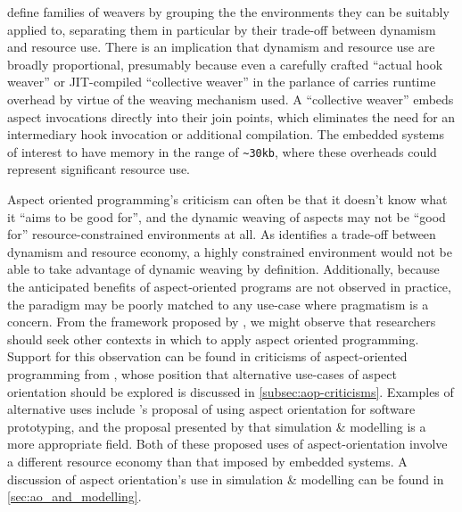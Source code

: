 \citeauthor{gilani2004family} define families of weavers by grouping the the
environments they can be suitably applied to, separating them in particular by
their trade-off between dynamism and resource use. There is an implication that
dynamism and resource use are broadly proportional, presumably because even a
carefully crafted ``actual hook weaver'' or JIT-compiled ``collective weaver''
in the parlance of \citet{dynamicAOchitchyan} carries runtime overhead by virtue
of the weaving mechanism used. A ``collective weaver'' embeds aspect invocations
directly into their join points, which eliminates the need for an intermediary
hook invocation or additional compilation. The embedded systems of interest to
\citeauthor{gilani2004family} have memory in the range of \lstinline{~30kb},
where these overheads could represent significant resource use.

Aspect oriented programming's criticism can often be that it doesn't know what
it ``aims to be good for'', and the dynamic weaving of aspects may not be
``good for'' resource-constrained environments at all. As
\citeauthor{gilani2004family} identifies a trade-off between dynamism and
resource economy, a highly constrained environment would not be able to take
advantage of dynamic weaving by definition. Additionally, because the
anticipated benefits of aspect-oriented programs are not observed in practice,
the paradigm may be poorly matched to any use-case where pragmatism is a
concern. From the framework proposed by \citet{gilani2004family}, we might
observe that researchers should seek other contexts in which to apply aspect
oriented programming. Support for this observation can be found in criticisms of
aspect-oriented programming from \citet{steimann06paradoxical}, whose position
that alternative use-cases of aspect orientation should be explored is discussed
in \cref{subsec:aop-criticisms}. Examples of alternative uses include
\citeauthor{popovici2002PROSE}'s proposal of using aspect orientation for
software prototyping, and the proposal presented by \citet{gulyas1999use} that
simulation \& modelling is a more appropriate field. Both of these proposed uses
of aspect-orientation involve a different resource economy than that imposed by
embedded systems. A discussion of aspect orientation's use in simulation \&
modelling can be found in \cref{sec:ao_and_modelling}.



